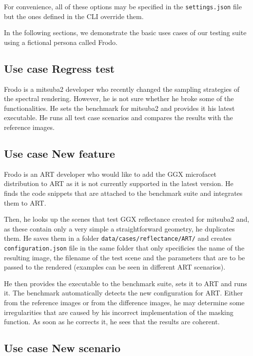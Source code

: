 For convenience, all of these options may be specified in the \texttt{settings.json} file but the ones defined in the CLI override them.

In the following sections, we demonstrate the basic uses cases of our testing suite using a fictional persona called Frodo.

\subsection{Use case Regress test}

Frodo is a mitsuba2 developer who recently changed the sampling strategies of the spectral rendering. However, he is not sure whether he broke some of the functionalities. He sets the benchmark for mitsuba2 and provides it his latest executable. He runs all test case scenarios and compares the results with the reference images.
 
\subsection{Use case New feature}
\label{sec:frodo}
Frodo is an ART developer who would like to add the GGX microfacet distribution to ART as it is not currently supported in the latest version. He finds the code snippets that are attached to the benchmark suite and integrates them to ART.

Then, he looks up the scenes that test GGX reflectance created for mitsuba2 and, as these contain only a very simple a straightforward geometry, he duplicates them. He saves them in a folder \texttt{data/cases/reflectance/ART/} and creates \texttt{configuration.json} file in the same folder that only specificies the name of the resulting image, the filename of the test scene and the parameters that are to be passed to the rendered (examples can be seen in different ART scenarios).

He then provides the executable to the benchmark suite, sets it to ART and runs it. The benchmark automatically detects the new configuration for ART. Either from the reference images or from the difference images, he may determine some irregularities that are caused by his incorrect implementation of the masking function. As soon as he corrects it, he sees that the results are coherent.

\subsection{Use case New scenario}

